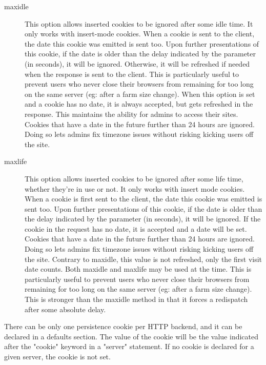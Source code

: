 \begin{description}
  \item[maxidle]
              This option allows inserted cookies to be ignored after some idle
              time. It only works with insert-mode cookies. When a cookie is
              sent to the client, the date this cookie was emitted is sent too.
              Upon further presentations of this cookie, if the date is older
              than the delay indicated by the parameter (in seconds), it will
              be ignored. Otherwise, it will be refreshed if needed when the
              response is sent to the client. This is particularly useful to
              prevent users who never close their browsers from remaining for
              too long on the same server (eg: after a farm size change). When
              this option is set and a cookie has no date, it is always
              accepted, but gets refreshed in the response. This maintains the
              ability for admins to access their sites. Cookies that have a
              date in the future further than 24 hours are ignored. Doing so
              lets admins fix timezone issues without risking kicking users off
              the site.

  \item[maxlife]
              This option allows inserted cookies to be ignored after some life
              time, whether they're in use or not. It only works with insert
              mode cookies. When a cookie is first sent to the client, the date
              this cookie was emitted is sent too. Upon further presentations
              of this cookie, if the date is older than the delay indicated by
              the parameter (in seconds), it will be ignored. If the cookie in
              the request has no date, it is accepted and a date will be set.
              Cookies that have a date in the future further than 24 hours are
              ignored. Doing so lets admins fix timezone issues without risking
              kicking users off the site. Contrary to maxidle, this value is
              not refreshed, only the first visit date counts. Both maxidle and
              maxlife may be used at the time. This is particularly useful to
              prevent users who never close their browsers from remaining for
              too long on the same server (eg: after a farm size change). This
              is stronger than the maxidle method in that it forces a
              redispatch after some absolute delay.
  \end{description}

  There can be only one persistence cookie per HTTP backend, and it can be
  declared in a defaults section. The value of the cookie will be the value
  indicated after the "cookie" keyword in a "server" statement. If no cookie
  is declared for a given server, the cookie is not set.

